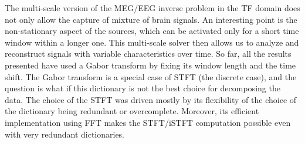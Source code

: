 The multi-scale version of the MEG/EEG inverse problem in the TF domain does not only allow the capture of mixture of brain signals. An interesting point is the non-stationary aspect of the sources, which can be activated only for a short time window within a longer one. This multi-scale solver then allows us to analyze and reconstruct signals with variable characteristics over time. So far, all the results presented have used a Gabor transform by fixing its window length and the time shift. The Gabor transform is a special case of STFT (the discrete case), and the question is what if this dictionary is not the best choice for decomposing the data. The choice of the STFT was driven mostly by its flexibility of the choice of the dictionary being redundant or overcomplete. Moreover, its efficient implementation using FFT makes the STFT/iSTFT computation possible even with very redundant dictionaries.\\

